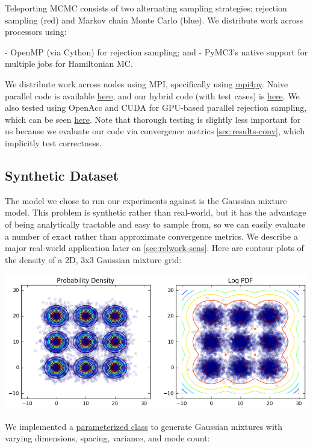 \documentclass{article}
\begin{document}
Teleporting MCMC consists of two alternating sampling strategies; rejection
sampling (red) and Markov chain Monte Carlo (blue). We distribute work across
processors using:

- OpenMP (via Cython) for rejection sampling; and - PyMC3's native support for
multiple jobs for Hamiltonian MC.

We distribute work across nodes using MPI, specifically using
\href{http://mpi4py.scipy.org/}{mpi4py}. Naive parallel code is available
\href{https://github.com/asross/cs205-project/blob/master/odyssey_setup/mpi_mcmc/mpi_mcmc.py}{here},
and our hybrid code (with test cases) is
\href{https://github.com/asross/cs205-project/tree/master/odyssey_setup/teleporting_mcmc2}{here}.
We also tested using OpenAcc and CUDA for GPU-based parallel rejection
sampling, which can be seen
\href{https://github.com/asross/cs205-project/tree/master/odyssey_rejection_sampling}{here}.
Note that thorough testing is slightly less important for us because we
evaluate our code via convergence metrics \ref{sec:results-conv}, which implicitly
test correctness.

\subsection{Synthetic Dataset}

The model we chose to run our experiments against is the Gaussian mixture
model.  This problem is synthetic rather than real-world, but it has the
advantage of being analytically tractable and easy to sample from, so we can
easily evaluate a number of exact rather than approximate convergence metrics.
We describe a major real-world application later on \ref{sec:relwork-sens}. Here are
contour plots of the density of a 2D, 3x3 Gaussian mixture grid:

\includegraphics[width=\textwidth]{pdf-and-log-pdf.png}

We implemented a \href{https://github.com/asross/cs205-project/blob/master/datasets/gaussian_mixture_grid.py}{parameterized class}
to generate Gaussian mixtures with varying dimensions, spacing, variance, and
mode count:
\end{document}
